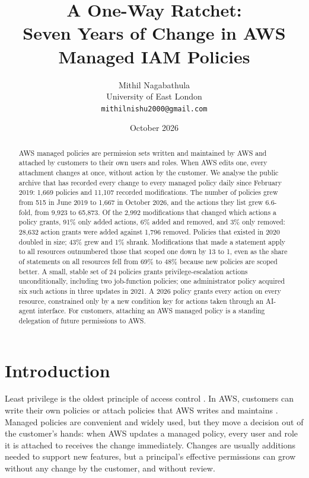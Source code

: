 \documentclass[11pt]{article}
\title{A One-Way Ratchet:\\
\large Seven Years of Change in AWS Managed IAM Policies}
\author{Mithil Nagabathula\\University of East London\\\texttt{mithilnishu2000@gmail.com}}
\date{October 2026}
\begin{document}
\maketitle
\sloppy

\begin{abstract}
AWS managed policies are permission sets written and maintained by AWS and attached by customers to their own users and roles. When AWS
edits one, every attachment changes at once, without action by the customer. We analyse the public archive that has recorded every
change to every managed policy daily since February 2019: 1{,}669 policies and 11{,}107 recorded modifications. The number of policies
grew from 515 in June 2019 to 1{,}667 in October 2026, and the actions they list grew 6.6-fold, from 9{,}923 to 65{,}873. Of the 2{,}992
modifications that changed which actions a policy grants, 91\% only added actions, 6\% added and removed, and 3\% only removed:
28{,}632 action grants were added against 1{,}796 removed. Policies that existed in 2020 doubled in size; 43\% grew and 1\% shrank.
Modifications that made a statement apply to all resources outnumbered those that scoped one down by 13 to 1, even as the share of
statements on all resources fell from 69\% to 48\% because new policies are scoped better. A small, stable set of 24 policies grants
privilege-escalation actions unconditionally, including two job-function policies; one administrator policy acquired six such actions
in three updates in 2021. A 2026 policy grants every action on every resource, constrained only by a new condition key for actions taken
through an AI-agent interface. For customers, attaching an AWS managed policy is a standing delegation of future permissions to AWS.
\end{abstract}

\section{Introduction}
Least privilege is the oldest principle of access control \cite{saltzer1975}. In AWS, customers can write their own policies or attach
policies that AWS writes and maintains \cite{awsmanaged}. Managed policies are convenient and widely used, but they move a decision out
of the customer's hands: when AWS updates a managed policy, every user and role it is attached to receives the change immediately.
Changes are usually additions needed to support new features, but a principal's effective permissions can grow without any change by
the customer, and without review.
\end{document}
